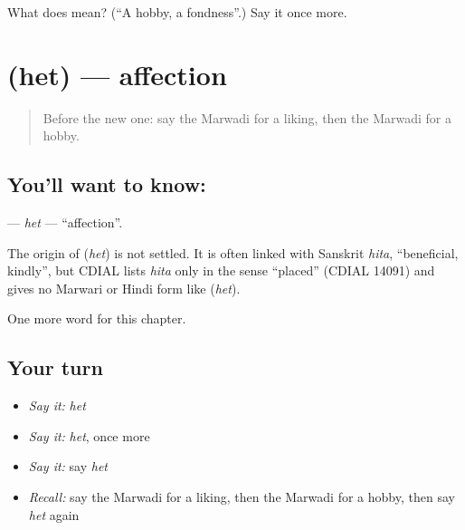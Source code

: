 \begin{tcolorbox}[breakable,colback=teal!4,colframe=teal!35!black,title={Before you move on}]
What does  mean? (\textquotedblleft{}A hobby, a fondness\textquotedblright{}.) Say it once more.
\end{tcolorbox}
\section[\texorpdfstring{\mw{हेत} (het)}{हेत (het)}]{ (het) — affection}

\label{lesson:MW-C113-het}



\begin{quote}
Before the new one: say the Marwadi for a liking, then the Marwadi for a hobby.
\end{quote}

\subsection*{You'll want to know: }
\textbf{} — \emph{het} — \textquotedblleft{}affection\textquotedblright{}.

\begin{cousinweb}
The origin of \textbf{} (\emph{het}) is not settled. It is often linked with Sanskrit \emph{hita}, \textquotedblleft{}beneficial, kindly\textquotedblright{}, but CDIAL lists \emph{hita} only in the sense \textquotedblleft{}placed\textquotedblright{} (CDIAL 14091) and gives no Marwari or Hindi form like \textbf{} (\emph{het}).
\end{cousinweb}

\begin{grammarlens}[title={What you've built}]
One more word for this chapter.
\end{grammarlens}

\subsection*{Your turn}
\begin{itemize}
\raggedright
  \item \emph{Say it:} \emph{het}
  \item \emph{Say it:} \emph{het}, once more
  \item \emph{Say it:} say \emph{het}
  \item \emph{Recall:} say the Marwadi for a liking, then the Marwadi for a hobby, then say \emph{het} again
\end{itemize}

